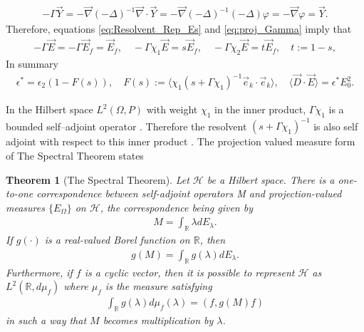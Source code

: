 \documentclass[english,12pt]{ttuthes}
\newtheorem{theorem}{Theorem}[chapter]
\begin{document}
% 
\begin{align}\label{eq:proj_Gamma}
  -\Gamma\vec{Y}=-\vec{\nabla}(-\Delta)^{-1}\vec{\nabla}\cdot\vec{Y}
              =-\vec{\nabla}(-\Delta)^{-1}(-\Delta)\varphi
              =-\vec{\nabla}\varphi
              =\vec{Y}.
\end{align}
%
Therefore, equations \eqref{eq:Resolvent_Rep_Es} and
\eqref{eq:proj_Gamma} imply that
%
\begin{align}
  -\Gamma\vec{E}=-\Gamma\vec{E}_f=\vec{E}_f, \quad
  -\Gamma\chi_1\vec{E}=s\vec{E}_f, \quad
  -\Gamma\chi_2\vec{E}=t\vec{E}_f, \quad
  t:=1-s,
\end{align}
%
In summary
%
\begin{align}\label{eq:Herglotz_Energy_Rep_E}
  \epsilon^*=\epsilon_2(1-F(s)),\quad
  F(s):=\langle\chi_1(s+\Gamma\chi_1)^{-1}\vec{e}_k\cdot\vec{e}_k\rangle, \quad
  \langle\vec{D}\cdot\vec{E}\rangle=\epsilon^*E_0^2.
\end{align}
%

In the Hilbert space $L^2(\Omega,P)$ with weight $\chi_1$ in the
inner product, $\Gamma\chi_1$ is a bounded self--adjoint operator
\cite{Golden:CMP-473}. Therefore the resolvent $(s+\Gamma\chi_1)^{-1}$ is also self
adjoint with respect to this inner product \cite{Stone:64}. The
projection valued measure form of The Spectral Theorem states
\cite{Reed-1980} 
%
\begin{theorem}[The Spectral Theorem]\label{thm:Spectral_Theorem}
  Let $\mathscr{H}$ be a Hilbert space. There is a one-to-one
  correspondence between self-adjoint operators M and
  projection-valued measures $\{E_\Omega\}$ on $\mathscr{H}$, the
  correspondence being given by 
  \begin{align}
    M=\int_{\mathbb{R}} \lambda dE_\lambda. 
  \end{align}
  If $g(\cdot)$ is a real-valued Borel function on $\mathbb{R}$, then
  \begin{align}
    g(M)=\int_{\mathbb{R}} g(\lambda) dE_\lambda.
  \end{align}
  Furthermore, if $f$ is a cyclic vector, then it is possible to
  represent $\mathscr{H}$ as $L^2(\mathbb{R}, d\mu_f)$ where $\mu_f$ is
  the measure satisfying
  \begin{align}
    \int_{\mathbb{R}} g(\lambda)d\mu_f(\lambda)=(f,g(M)f)
  \end{align}
  in such a way that $M$ becomes multiplication by $\lambda$.
\end{theorem}
\end{document}
